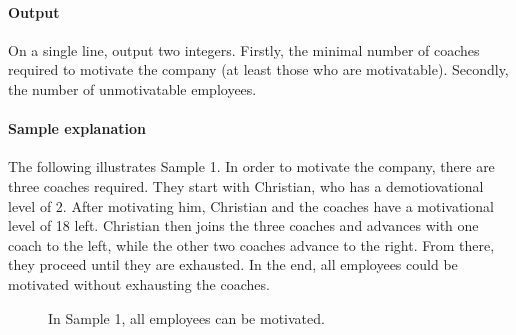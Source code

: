 \paragraph*{Output}

On a single line, output two integers.
Firstly, the minimal number of coaches required to motivate the company (at least those who are motivatable).
Secondly, the number of unmotivatable employees.

\paragraph*{Sample explanation}

The following illustrates Sample 1. In order to motivate the company, there are three coaches
required. They start with Christian, who has a demotiovational level of 2. After motivating him,
Christian and the coaches have a motivational level of 18 left. Christian then joins the three 
coaches and advances with one coach to the left, while the other two coaches advance to the right. 
From there, they proceed until they are exhausted. In the end, all employees could be motivated
without exhausting the coaches.

\begin{figure}[h!]
  \centering

  \caption{In Sample 1, all employees can be motivated.}
\end{figure}


\begin{samples}
\end{samples}



